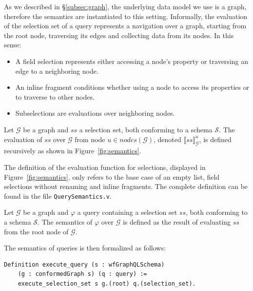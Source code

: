As we described in \S\ref{subsec:graph}, the underlying data model we use is a graph, therefore the semantics are instantiated to this setting. %
Informally, the evaluation of the selection set of a query represents a navigation over a graph, starting from the root node, traversing its edges and collecting data from its nodes. In this sense:
\begin{itemize}
    \item A field selection represents either accessing a node's property or traversing an edge to a neighboring node.
    \item An inline fragment conditions whether using a node to access its properties or to traverse to other nodes.
    \item Subselections are evaluations over neighboring nodes.
\end{itemize}

\begin{definition}
Let $\mathcal{G}$ be a graph and $ss$ a selection set, both conforming to a schema $\mathcal{S}$. The evaluation of $ss$ over $\mathcal{G}$ from node $u \in \mathit{nodes}(\mathcal{G})$, denoted $\llbracket ss \rrbracket^{u}_{\mathcal{G}}$, is defined recursively as shown in Figure~\ref{fig:semantics}. 
\end{definition}

The definition of the evaluation function for selections, displayed in Figure~\ref{fig:semantics}, only refers to the base case of an empty list, field selections without renaming and inline fragments. The complete definition can be found in the file \texttt{QuerySemantics.v}.

\begin{definition}
Let $\mathcal{G}$ be a graph and $\varphi$ a query containing a selection set $ss$, both conforming to a schema $\mathcal{S}$. The semantics of $\varphi$ over $\mathcal{G}$ is defined as the result of evaluating $ss$ from the root node of $\mathcal{G}$.
\end{definition}

The semantics of queries is then formalized as follows:
\begin{verbatim}
Definition execute_query (s : wfGraphQLSchema)
    (g : conformedGraph s) (q : query) :=
    execute_selection_set s g.(root) q.(selection_set).
\end{verbatim}

